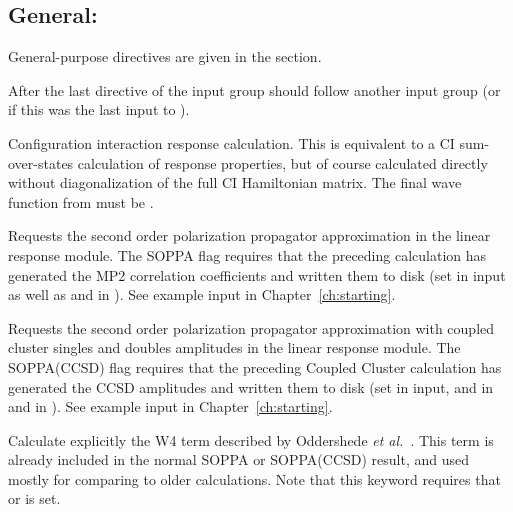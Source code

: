 \subsection{General: }

General-purpose directives are given in the  section.

After the last directive of the  input group
should follow another {} input group
(or  if this was the last input to \dalton).

\begin{description}

\item{}
Configuration interaction
response calculation. 
This is equivalent to a CI sum-over-states
calculation of response properties,
but of course calculated directly without diagonalization of the full
CI Hamiltonian matrix.
The final wave function from  must be .

\item{}
Requests the second order polarization propagator approximation 
in the linear response module.
The SOPPA
flag requires that
the preceding {\sir} calculation has generated the MP2 correlation
coefficients and written them to disk (set  in 
input as well as  and  in ). See
example input in Chapter~\ref{ch:starting}.

\item{}
Requests the second order polarization propagator approximation with coupled 
cluster singles and doubles amplitudes in the linear response module.
The SOPPA(CCSD)
 flag requires that the preceding Coupled Cluster 
calculation has generated the CCSD amplitudes and written them to disk 
(set  in 
 input,  and  in   and 
 in ). See example input in 
Chapter~\ref{ch:starting}.

\item{}
Calculate explicitly the W4 term described by Oddershede {\it et
al.\/}~\cite{jopjdycpr2}. This term is already included in the normal
SOPPA or 
SOPPA(CCSD) result, and used mostly for comparing to older
calculations. Note that this keyword requires that  or 
is set.


\end{description}
